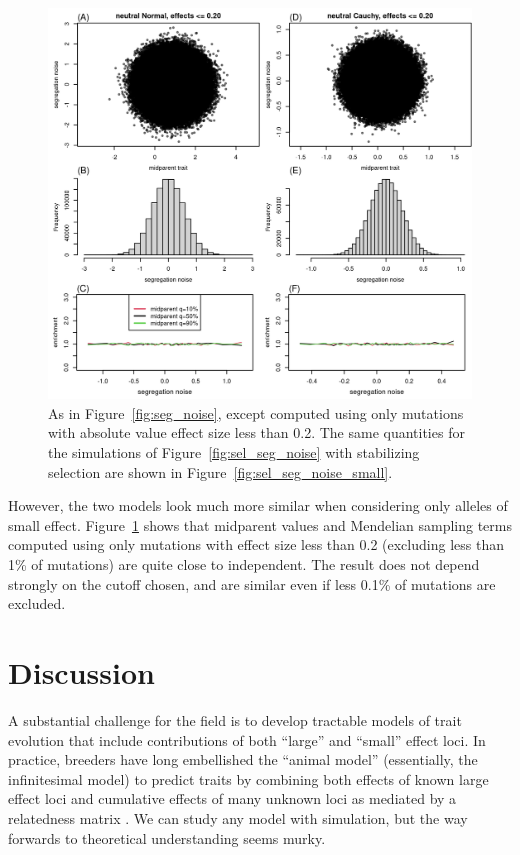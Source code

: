 \documentclass{article}
\newcommand{\1}{\mathbbm{1}}
\theoremstyle{remark}
\theoremstyle{definition}
\begin{document}
\begin{figure}
    \begin{center}
        \includegraphics{sims/neutral_seg_noise_small}
    \end{center}
    \caption{
        As in Figure~\ref{fig:seg_noise},
        except computed using only mutations with absolute value effect size less than 0.2.
        The same quantities for the simulations of Figure~\ref{fig:sel_seg_noise}
        with stabilizing selection are shown in Figure~\ref{fig:sel_seg_noise_small}.
        \label{fig:seg_noise_small}
    }
\end{figure}


However,
the two models look much more similar when considering only alleles of small effect.
Figure~\ref{fig:seg_noise_small} shows that midparent values
and Mendelian sampling terms computed using only mutations with effect size less than 0.2
(excluding less than 1\% of mutations)
are quite close to independent.
The result does not depend strongly on the cutoff chosen,
and are similar even if less 0.1\% of mutations are excluded.

\section{Discussion}

A substantial challenge for the field is to develop tractable models of trait evolution
that include contributions of both ``large'' and ``small'' effect loci.
In practice, breeders have long embellished the ``animal model'' (essentially, the infinitesimal model)
to predict traits
by combining both effects of known large effect loci
and cumulative effects of many unknown loci as mediated by a relatedness matrix
\citep[e.g.,][]{fernando1989marker,teissier2018weighted,bernardo2014genomewide,rice2019evaluation}.
We can study any model with simulation,
but the way forwards to theoretical understanding seems murky.
\end{document}
